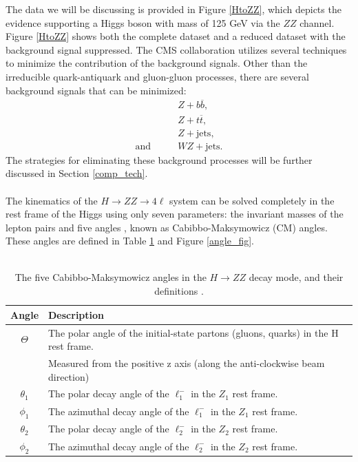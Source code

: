 \documentclass[12pt]{article}
\newcommand{\npar}{\\ \\ \noindent}
\begin{document}
The data we will be discussing is provided in Figure \ref{HtoZZ}, which depicts the evidence supporting a Higgs boson with mass of 125 GeV via the $ZZ$ channel. Figure \ref{HtoZZ} shows both the complete dataset and a reduced dataset with the background signal suppressed. The CMS collaboration utilizes several techniques to minimize the contribution of the background signals. Other than the irreducible quark-antiquark and gluon-gluon processes, there are several background signals that can be minimized\cite{new_higgs}:
\begin{align}
& Z + b \overline{b}, \\
& Z + t \overline{t}, \\
& Z + \text{jets}, \\
\text{and} \qquad & WZ + \text{jets} .
\end{align}
The strategies for eliminating these background processes will be further discussed in Section \ref*{comp_tech}.
\npar
The kinematics of the $H \to ZZ \to 4 \ell$ system can be solved completely in the rest frame of the Higgs using only seven parameters: the invariant masses of the lepton pairs and five angles \cite{new_higgs}, known as Cabibbo-Maksymowicz (CM) angles\cite{higgs_angles}. These angles are defined in Table \ref{angle_table} and Figure \ref{angle_fig}. \\ \\
\begin{table}[h!]
\centering
\begin{tabular}{|c|l|}
\hline
Angle & Description \\ \hline \hline
$\Theta$ & The polar angle of the initial-state partons (gluons, quarks) in the H rest frame. \\ & Measured from the positive z axis (along the anti-clockwise beam direction) \\ \hline
$\theta_1$ & The polar decay angle of the $\ell_1^-$ in the $Z_1$ rest frame. \\ \hline
$\phi_1$ & The azimuthal decay angle of the $\ell_1^-$ in the $Z_1$ rest frame. \\ \hline  
$\theta_2$ & The polar decay angle of the $\ell_2^-$ in the $Z_2$ rest frame. \\ \hline
$\phi_2$ &  The azimuthal decay angle of the $\ell_2^-$ in the $Z_2$ rest frame. \\ \hline
\end{tabular}
\caption{The five Cabibbo-Maksymowicz angles in the $H \to ZZ$ decay mode, and their definitions \cite{higgs_angles}.}
\label{angle_table}
\end{table}
\end{document}
